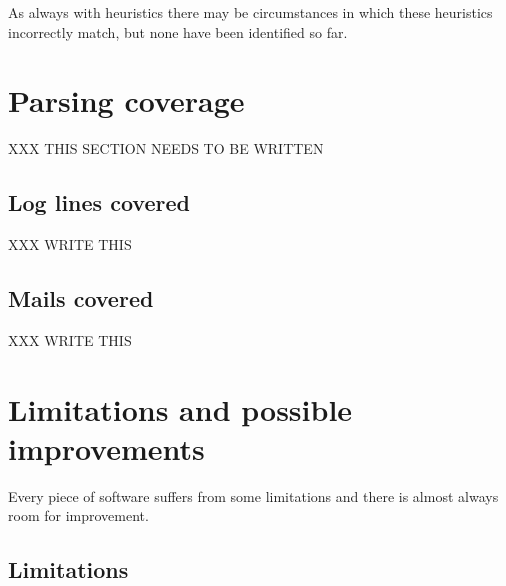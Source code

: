 \documentclass[a4paper,12pt,draft]{article}
\begin{document}
As always with heuristics there may be circumstances in which these
heuristics incorrectly match, but none have been identified so far.

\section{Parsing coverage}

XXX THIS SECTION NEEDS TO BE WRITTEN

\label{parsing-coverage}

\subsection{Log lines covered}

\label{log-lines-covered}

XXX WRITE THIS

\subsection{Mails covered}

\label{mails-covered}

XXX WRITE THIS

\section{Limitations and possible improvements}

\label{limitations-improvements}

Every piece of software suffers from some limitations and there is almost
always room for improvement.

\subsection{Limitations}
\end{document}

